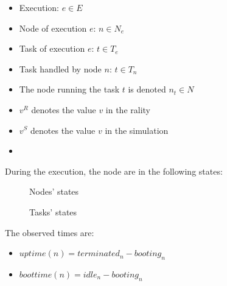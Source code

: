 {\begin{itemize}
 \item Execution: $e \in E$
 \item Node of execution $e$: $n \in N_e$
 \item Task of execution $e$: $t \in T_e$
 \item Task handled by node $n$: $t \in T_n$
 \item The node running the task $t$ is denoted $n_t \in N$
 \item $v^R$ denotes the value $v$ in the rality
 \item $v^S$ denotes the value $v$ in the simulation
 \item 
\end{itemize}

During the execution, the node are in the following states:

\begin{figure}
\resizebox{\textwidth}{!}{%

}
\caption{Nodes' states}
\end{figure}

\begin{figure}
\resizebox{\textwidth}{!}{%

}
\caption{Tasks' states}
\end{figure}

\begin{comment}
\begin{enumerate}
 \item Future: Once the decision to start the node is made;
 \item Pending: Once the node is requested to the cloud-kit;
 \item Booting: Once the cloud-kit aknowledge the satisfaction of the request;
 \item Idle: Once the node is ready to run tasks;
 \item Busy: Once the node is running one task;
 \item ShuttingDown: Once the termination of the node is aked to the cloud-kit;
 \item Terminated: Once the node is terminated.
\end{enumerate}
\end{comment}


The observed times are:
\begin{itemize}
 \item $uptime(n) = terminated_n - booting_n$ 
 \item $boottime(n) = idle_n - booting_n$ 
\end{itemize}


}

